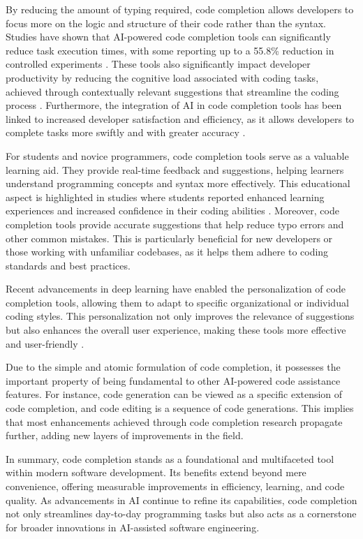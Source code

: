 By reducing the amount of typing required, code completion allows developers to focus more on the logic and structure of their code rather than the syntax. Studies have shown that AI-powered code completion tools can significantly reduce task execution times, with some reporting up to a 55.8\% reduction in controlled experiments \parencite{peng2023}. These tools also significantly impact developer productivity by reducing the cognitive load associated with coding tasks, achieved through contextually relevant suggestions that streamline the coding process \parencite{weber2024}. Furthermore, the integration of AI in code completion tools has been linked to increased developer satisfaction and efficiency, as it allows developers to complete tasks more swiftly and with greater accuracy \parencite{bakal2025}.

For students and novice programmers, code completion tools serve as a valuable learning aid. They provide real-time feedback and suggestions, helping learners understand programming concepts and syntax more effectively. This educational aspect is highlighted in studies where students reported enhanced learning experiences and increased confidence in their coding abilities \parencite{takerngsaksiri2023}. Moreover, code completion tools provide accurate suggestions that help reduce typo errors and other common mistakes. This is particularly beneficial for new developers or those working with unfamiliar codebases, as it helps them adhere to coding standards and best practices.

Recent advancements in deep learning have enabled the personalization of code completion tools, allowing them to adapt to specific organizational or individual coding styles. This personalization not only improves the relevance of suggestions but also enhances the overall user experience, making these tools more effective and user-friendly \parencite{giagnorio2025}.

Due to the simple and atomic formulation of code completion, it possesses the important property of being fundamental to other AI-powered code assistance features. For instance, code generation can be viewed as a specific extension of code completion, and code editing is a sequence of code generations. This implies that most enhancements achieved through code completion research propagate further, adding new layers of improvements in the field.

In summary, code completion stands as a foundational and multifaceted tool within modern software development. Its benefits extend beyond mere convenience, offering measurable improvements in efficiency, learning, and code quality. As advancements in AI continue to refine its capabilities, code completion not only streamlines day-to-day programming tasks but also acts as a cornerstone for broader innovations in AI-assisted software engineering.

